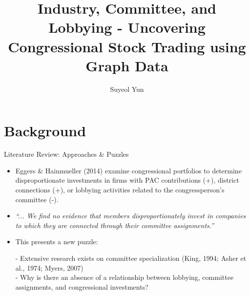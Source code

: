 \documentclass{beamer}
\begin{document}
	\title[]{Industry, Committee, and Lobbying - Uncovering Congressional Stock Trading using Graph Data}
	\author[Suyeol Yun]{Suyeol Yun}
	\frame{\titlepage}
	\section{Background}


	\begin{frame}{Literature Review: Approaches \& Puzzles}
		\begin{itemize}
			\item Eggers \& Hainmueller (2014) examine congressional portfolios to determine disproportionate investments in firms with PAC contributions (+), district connections (+), or lobbying activities related to the congressperson's committee (-).
			\item \textit{``... We find no evidence that members disproportionately invest in companies to which they are connected through their committee assignments.''}
			\item This presents a new puzzle:

			- Extensive research exists on committee specialization (King, 1994; Asher et al., 1974; Myers, 2007)\\
			- Why is there an absence of a relationship between lobbying, committee assignments, and congressional investments?
		\end{itemize}
	\end{frame}
\end{document}
